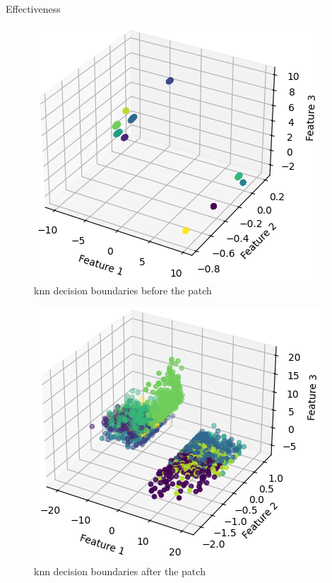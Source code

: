 \documentclass[aspectratio=169]{beamer}
[aspectratio=169] %
\begin{document}

\begin{frame}{Effectiveness}
  \begin{minipage}{0.49\textwidth}
    \begin{figure}
      \centering
      \includegraphics[height=0.45\textheight]{figures/knn_before.png}
      \caption{knn decision boundaries before the patch}
    \end{figure}
  \end{minipage}
  \hfill
  \begin{minipage}{0.49\textwidth}
    \begin{figure}
      \centering
      \includegraphics[height=0.45\textheight]{figures/knn_after.png}
      \caption{knn decision boundaries after the patch}
    \end{figure}
  \end{minipage}
\end{frame}
\end{document}
